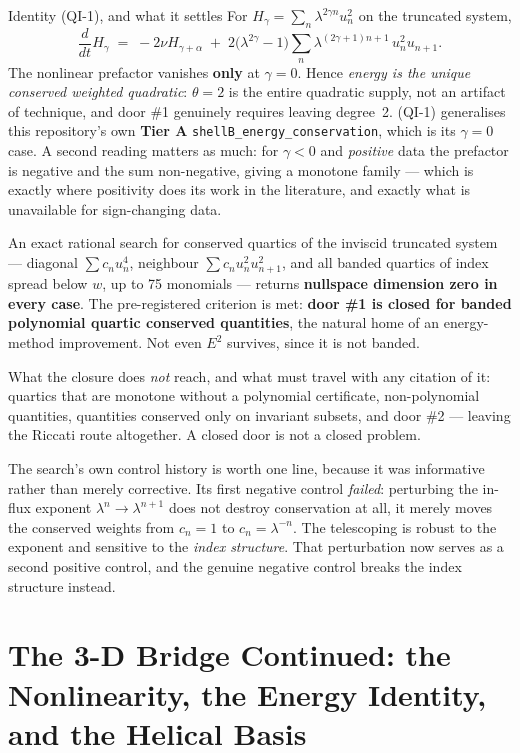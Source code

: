 \documentclass[11pt,a4paper]{article}
\newcommand{\tA}{\textcolor{TierA}{\textbf{Tier A}}}
\theoremstyle{definition}
\theoremstyle{plain}
\begin{document}
\begin{keybox}{Identity (QI-1), and what it settles}
For $H_\gamma=\sum_n\lambda^{2\gamma n}u_n^2$ on the truncated system,
\[
\frac{d}{dt}H_\gamma \;=\; -2\nu H_{\gamma+\alpha} \;+\; 2\bigl(\lambda^{2\gamma}-1\bigr)
\sum_{n}\lambda^{(2\gamma+1)n+1}\,u_n^2u_{n+1}.
\]
The nonlinear prefactor vanishes \textbf{only} at $\gamma=0$. Hence \emph{energy is the unique
conserved weighted quadratic}: $\theta=2$ is the entire quadratic supply, not an artifact of
technique, and door \#1 genuinely requires leaving degree~2. (QI-1) generalises this repository's
own \tA{} \texttt{shellB\_energy\_conservation}, which is its $\gamma=0$ case. A second reading
matters as much: for $\gamma<0$ and \emph{positive} data the prefactor is negative and the sum
non-negative, giving a monotone family --- which is exactly where positivity does its work in
the literature, and exactly what is unavailable for sign-changing data.
\end{keybox}

An exact rational search for conserved quartics of the inviscid truncated system --- diagonal
$\sum c_nu_n^4$, neighbour $\sum c_nu_n^2u_{n+1}^2$, and all banded quartics of index spread
below $w$, up to 75 monomials --- returns \textbf{nullspace dimension zero in every case}. The
pre-registered criterion is met: \textbf{door \#1 is closed for banded polynomial quartic
conserved quantities}, the natural home of an energy-method improvement. Not even $E^2$
survives, since it is not banded.

What the closure does \emph{not} reach, and what must travel with any citation of it: quartics
that are monotone without a polynomial certificate, non-polynomial quantities, quantities
conserved only on invariant subsets, and door \#2 --- leaving the Riccati route altogether. A
closed door is not a closed problem.

The search's own control history is worth one line, because it was informative rather than
merely corrective. Its first negative control \emph{failed}: perturbing the in-flux exponent
$\lambda^n\to\lambda^{n+1}$ does not destroy conservation at all, it merely moves the conserved
weights from $c_n=1$ to $c_n=\lambda^{-n}$. The telescoping is robust to the exponent and
sensitive to the \emph{index structure}. That perturbation now serves as a second positive
control, and the genuine negative control breaks the index structure instead.

\section{The 3-D Bridge Continued: the Nonlinearity, the Energy Identity, and the Helical Basis}
\label{sec:sept}
\end{document}
